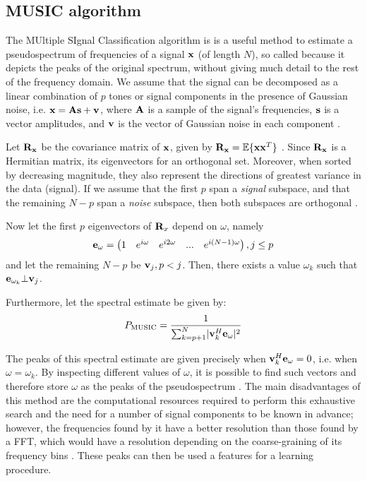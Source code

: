 \documentclass[../main.tex]{subfiles}
\begin{document}
\subsection{MUSIC algorithm} \label{subsection_music}
The MUltiple SIgnal Classification algorithm is is a useful method to estimate a pseudospectrum of frequencies of a signal $\mathbf{x}$ (of length $N$), so called because it depicts the peaks of the original spectrum, without giving much detail to the rest of the frequency domain. We assume that the signal can be decomposed as a linear combination of $p$ tones or signal components in the presence of Gaussian noise, i.e. $\mathbf{x} = \mathbf{As} + \mathbf{v}$, where $\mathbf{A}$ is a sample of the signal's frequencies, $\mathbf{s}$ is a vector amplitudes, and $\mathbf{v}$ is the vector of Gaussian noise in each component \cite{Evans}.
\par Let $\mathbf{R_x}$ be the covariance matrix of $\mathbf{x}$, given by $\mathbf{R_x} = \mathbb{E}\{\mathbf{xx}^T\}$ \cite{Evans}. Since $\mathbf{R_x}$ is a Hermitian matrix, its eigenvectors for an orthogonal set. Moreover, when sorted by decreasing magnitude, they also represent the directions of greatest variance in the data (signal). If we assume that the first $p$ span a \emph{signal} subspace, and that the remaining $N-p$ span a \emph{noise} subspace, then both subspaces are orthogonal \cite{Systems1989}. 
\par Now let the first $p$ eigenvectors of $\mathbf{R}_x$ depend on $\omega$, namely
\begin{align*}
\mathbf{e}_{\omega} = \begin{pmatrix}1&e^{i\omega}&e^{i2\omega}&...&e^{i(N-1)\omega}\end{pmatrix}, j \leq p
\end{align*}
and let the remaining $N-p$ be $\mathbf{v}_j, p < j$. Then, there exists a value $\omega_{k}$ such that $\mathbf{e}_{\omega_k}\bot\mathbf{v}_j$. 
\par Furthermore, let the spectral estimate \cite{Kootsookos1999, Mathworks2015} be given by:
\begin{align*}
P_\text{MUSIC} = \frac{1}{\sum_{k=p+1}^{N}\lvert\mathbf{v}_k^H\mathbf{e}_{\omega}\rvert^2}
\end{align*}
\par The peaks of this spectral estimate are given precisely when $\mathbf{v}_k^H\mathbf{e}_{\omega} = 0$, i.e. when $\omega = \omega_k$. By inspecting different values of $\omega$, it is possible to find such vectors and therefore store $\omega$ as the peaks of the pseudospectrum \cite{Delft2011}. The main disadvantages of this method are the computational resources required to perform this exhaustive search and the need for a number of signal components to be known in advance; however, the frequencies found by it have a better resolution than those found by a FFT, which would have a resolution depending on the coarse-graining of its frequency bins \cite{Kootsookos1999}. These peaks can then be used a features for a learning procedure.
\end{document}
